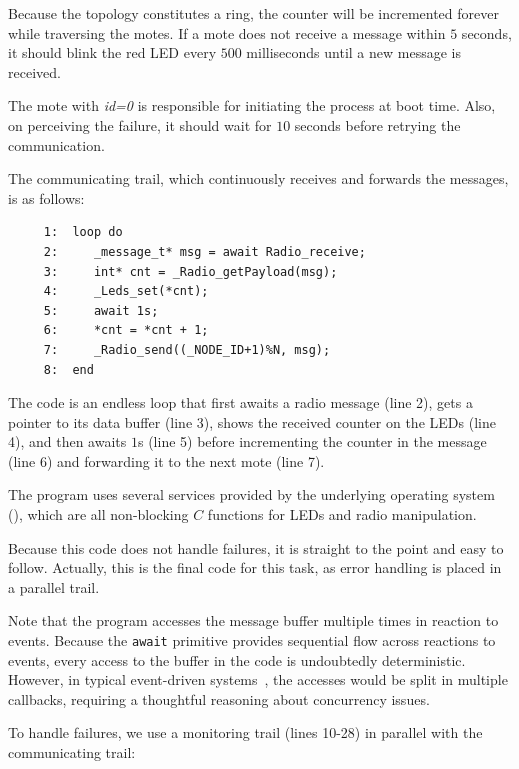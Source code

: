 \documentclass{sig-alternate}
\newcommand{\2}{\;\;}
\newcommand{\5}{\;\;\;\;\;}
\newcommand{\code}[1] {{\small{\texttt{#1}}}}
\begin{document}
Because the topology constitutes a ring, the counter will be incremented 
forever while traversing the motes.
If a mote does not receive a message within $5$ seconds, it should blink the 
red LED every $500$ milliseconds until a new message is received.

The mote with \emph{id=0} is responsible for initiating the process at boot 
time.
Also, on perceiving the failure, it should wait for $10$ seconds before 
retrying the communication.

The communicating trail, which continuously receives and forwards the messages, 
is as follows:

{\small
\begin{verbatim}
     1:  loop do
     2:     _message_t* msg = await Radio_receive;
     3:     int* cnt = _Radio_getPayload(msg);
     4:     _Leds_set(*cnt);
     5:     await 1s;
     6:     *cnt = *cnt + 1;
     7:     _Radio_send((_NODE_ID+1)%N, msg);
     8:  end
\end{verbatim}
}

The code is an endless loop that first awaits a radio message (line 2), gets a 
pointer to its data buffer (line 3), shows the received counter on the LEDs 
(line 4), and then awaits $1$s (line 5) before incrementing the counter in the 
message (line 6) and forwarding it to the next mote (line 7).

The program uses several services provided by the underlying operating system 
(\cite{wsn.tos}), which are all non-blocking $C$ functions for LEDs and radio 
manipulation.

Because this code does not handle failures, it is straight to the point and 
easy to follow.
Actually, this is the final code for this task, as error handling is placed in 
a parallel trail.

Note that the program accesses the message buffer multiple times in reaction to 
events.
Because the \code{await} primitive provides sequential flow across reactions to 
events, every access to the buffer in the code is undoubtedly deterministic.
However, in typical event-driven systems~\cite{wsn.nesc}, the accesses would be 
split in multiple callbacks, requiring a thoughtful reasoning about concurrency 
issues.

To handle failures, we use a monitoring trail (lines 10-28) in parallel with 
the communicating trail:
\end{document}
